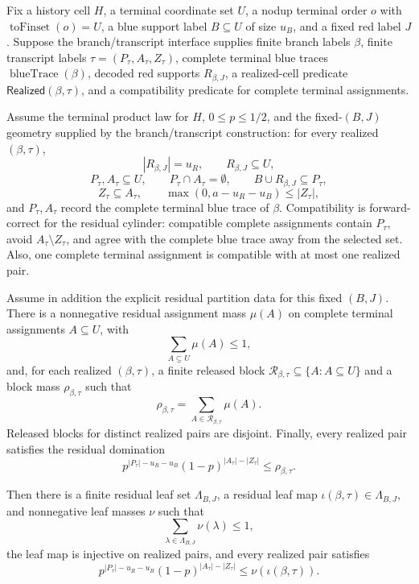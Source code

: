 \begin{helper}
Fix a history cell \(H\), a terminal coordinate set \(U\), a nodup terminal
order \(o\) with \(\operatorname{toFinset}(o)=U\), a blue support label
\(B\subseteq U\) of size \(u_B\), and a fixed red label \(J\).  Suppose the
branch/transcript interface supplies finite branch labels \(\beta\), finite
transcript labels \(\tau=(P_\tau,A_\tau,Z_\tau)\), complete terminal blue
traces \(\operatorname{blueTrace}(\beta)\), decoded red supports
\(R_{\beta,J}\), a realized-cell predicate
\(\mathsf{Realized}(\beta,\tau)\), and a compatibility predicate for
complete terminal assignments.

Assume the terminal product law for \(H\), \(0\le p\le1/2\), and the
fixed-\((B,J)\) geometry supplied by the branch/transcript construction:
for every realized \((\beta,\tau)\),
\[
|R_{\beta,J}|=u_R,\qquad R_{\beta,J}\subseteq U,
\]
\[
P_\tau,A_\tau\subseteq U,\qquad P_\tau\cap A_\tau=\emptyset,
\qquad B\cup R_{\beta,J}\subseteq P_\tau,
\]
\[
Z_\tau\subseteq A_\tau,\qquad
\max(0,a-u_R-u_B)\le |Z_\tau|,
\]
and \(P_\tau,A_\tau\) record the complete terminal blue trace of
\(\beta\).  Compatibility is forward-correct for the residual cylinder:
compatible complete assignments contain \(P_\tau\), avoid
\(A_\tau\setminus Z_\tau\), and agree with the complete blue trace away from
the selected set.  Also, one complete terminal assignment is compatible with
at most one realized pair.

Assume in addition the explicit residual partition data for this fixed
\((B,J)\).  There is a nonnegative residual assignment mass \(\mu(A)\) on
complete terminal assignments \(A\subseteq U\), with
\[
\sum_{A\subseteq U}\mu(A)\le 1,
\]
and, for each realized \((\beta,\tau)\), a finite released block
\(\mathcal R_{\beta,\tau}\subseteq\{A:A\subseteq U\}\) and a block mass
\(\rho_{\beta,\tau}\) such that
\[
\rho_{\beta,\tau}
  =\sum_{A\in\mathcal R_{\beta,\tau}}\mu(A).
\]
Released blocks for distinct realized pairs are disjoint.  Finally, every
realized pair satisfies the residual domination
\[
p^{|P_\tau|-u_R-u_B}(1-p)^{|A_\tau|-|Z_\tau|}
  \le \rho_{\beta,\tau}.
\]

Then there is a finite residual leaf set \(\Lambda_{B,J}\), a residual leaf
map \(\iota(\beta,\tau)\in\Lambda_{B,J}\), and nonnegative leaf masses
\(\nu\) such that
\[
\sum_{\lambda\in\Lambda_{B,J}}\nu(\lambda)\le1,
\]
the leaf map is injective on realized pairs, and every realized pair
satisfies
\[
p^{|P_\tau|-u_R-u_B}(1-p)^{|A_\tau|-|Z_\tau|}
  \le \nu(\iota(\beta,\tau)).
\]
\end{helper}

